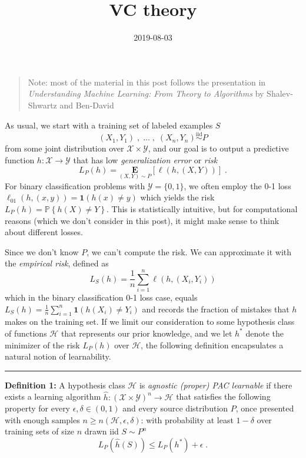 \documentclass[]{article}
\title{VC theory}
\author{}
\date{2019-08-03}
\begin{document}
\maketitle

\begin{quote}
Note: most of the material in this post follows the presentation in
\emph{Understanding Machine Learning: From Theory to Algorithms} by
Shalev-Shwartz and Ben-David
\end{quote}

As usual, we start with a training set of labeled examples \(S\) \[
(X_1, Y_1)\;, \;\ldots\;,\; (X_n, Y_n) \overset{\text{iid}}{\sim} P
\] from some joint distribution over \(\mathcal{X}\times \mathcal{Y}\),
and our goal is to output a predictive function
\(h: \mathcal{X} \rightarrow \mathcal{Y}\) that has low
\emph{generalization error} or \emph{risk} \[
L_P(h) = \underset{{(X,Y)\sim P}}{\mathbf{E}}\left[ \ell(h, (X,Y))\right]\;.
\] For binary classification problems with \(\mathcal{Y} = \{0, 1\}\),
we often employ the 0-1 loss
\(\ell_{01}(h, (x,y)) = \mathbf{1}(h(x)\ne y)\) which yields the risk
\(L_P(h) = \mathbb{P}\left\{ h(X) \ne Y \right\}\). This is
statistically intuitive, but for computational reasons (which we don't
consider in this post), it might make sense to think about different
losses.

Since we don't know \(P\), we can't compute the risk. We can approximate
it with the \emph{empirical risk}, defined as \[
L_S(h) = \frac{1}{n}\sum_{i=1}^n \ell(h, (X_i, Y_i))
\] which in the binary classification 0-1 loss case, equals
\(L_S(h) = \frac{1}{n} \sum_{i=1}^n \mathbf{1}(h(X_i) \ne Y_i)\) and
records the fraction of mistakes that \(h\) makes on the training set.
If we limit our consideration to some hypothesis class of functions
\(\mathcal{H}\) that represents our prior knowledge, and we let \(h^*\)
denote the minimizer of the risk \(L_P(h)\) over \(\mathcal{H}\), the
following definition encapsulates a natural notion of learnability.

\begin{center}\rule{0.5\linewidth}{\linethickness}\end{center}

\textbf{Definition 1:} A hypothesis class \(\mathcal{H}\) is
\emph{agnostic (proper) PAC learnable} if there exists a learning
algorithm
\(\hat{h}:(\mathcal{X}\times\mathcal{Y})^n \rightarrow \mathcal{H}\)
that satisfies the following property for every
\(\epsilon, \delta \in (0,1)\) and every source distribution \(P\), once
presented with enough samples
\(n \ge n(\mathcal{H}, \epsilon, \delta)\): with probability at least
\(1 - \delta\) over training sets of size \(n\) drawn iid \(S\sim P^n\)
\[
L_P(\hat{h}(S)) \le L_P(h^*) + \epsilon\;.
\]
\end{document}
